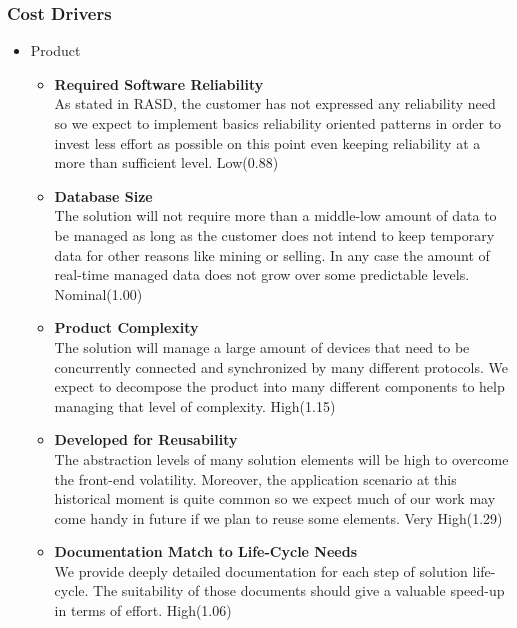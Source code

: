 \subsubsection{Cost Drivers}
\begin{itemize}
    \item Product
    \begin{itemize}
        \item \textbf{Required Software Reliability}\\
        As stated in RASD, the customer has not expressed any reliability need so we expect to implement basics reliability oriented patterns in order to invest less effort as possible on this point even keeping reliability at a more than sufficient level.
        \hfill Low(0.88)
        
        \item \textbf{Database Size}\\
        The solution will not require more than a middle-low amount of data to be managed as long as the customer does not intend to keep temporary data for other reasons like mining or selling. In any case the amount of real-time managed data does not grow over some predictable levels.
        \hfill Nominal(1.00)
        
        \item \textbf{Product Complexity}\\
        The solution will manage a large amount of devices that need to be concurrently connected and synchronized by many different protocols. We expect to decompose the product into many different components to help managing that level of complexity.
        \hfill High(1.15)
        
        \item \textbf{Developed for Reusability}\\
        The abstraction levels of many solution elements will be high to overcome the front-end volatility. Moreover, the application scenario at this historical moment is quite common so we expect much of our work may come handy in future if we plan to reuse some elements.
        \hfill Very High(1.29)
        
        \item \textbf{Documentation Match to Life-Cycle Needs}\\
        We provide deeply detailed documentation for each step of solution life-cycle. The suitability of those documents should give a valuable speed-up in terms of effort.
        \hfill High(1.06)
    \end{itemize}
    

\end{itemize}
